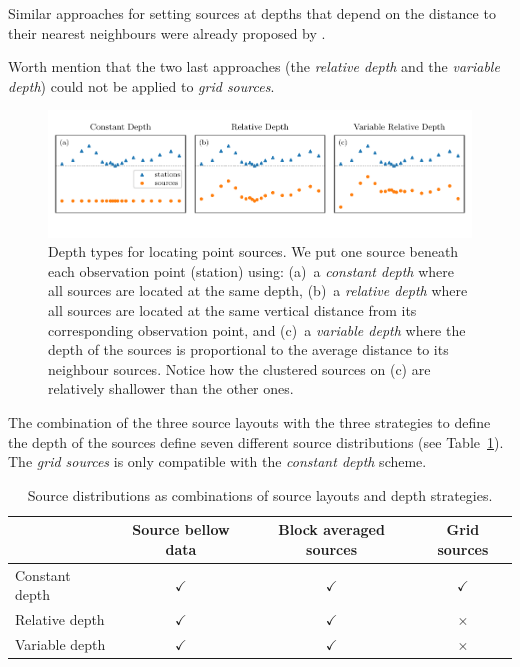 \documentclass[twocolumn]{article}
\begin{document}
Similar approaches for setting sources at depths that depend
on the distance to their nearest neighbours were already proposed by
\citet{cordell1992, guspi2004, guspi2009}.

Worth mention that the two last approaches (the \emph{relative depth} and the
\emph{variable depth}) could not be applied to \emph{grid sources}.


\begin{figure}
    \includegraphics[width=\linewidth]{figs/depth_types.pdf}
    \caption{
        Depth types for locating point sources. We put one source beneath each
        observation point (station) using:
        (a)~a \emph{constant depth} where all sources are located at the same
           depth,
        (b)~a \emph{relative depth} where all sources are located at the same
           vertical distance from its corresponding observation point, and
        (c)~a \emph{variable depth} where the depth of the sources is
           proportional to the average distance to its neighbour sources.
           Notice how the clustered sources on (c) are relatively shallower
           than the
           other ones.
    }
    \label{fig:depth-types}
\end{figure}

The combination of the three source layouts with the three strategies to define
the depth of the sources define seven different source distributions (see
Table~\ref{tab:source-distributions}).
The \emph{grid sources} is only compatible with the \emph{constant depth}
scheme.


\begin{table}
    \centering
    \caption{
        Source distributions as combinations of source layouts and depth
        strategies.
    }
    \label{tab:source-distributions}
    \begin{tabular}{lccc}
        & Source bellow data & Block averaged sources & Grid sources \\ \hline
        Constant depth & $\checkmark$ & $\checkmark$ & $\checkmark$ \\
        Relative depth & $\checkmark$ & $\checkmark$ & $\times$     \\
        Variable depth & $\checkmark$ & $\checkmark$ & $\times$     \\
    \end{tabular}
\end{table}
\end{document}
